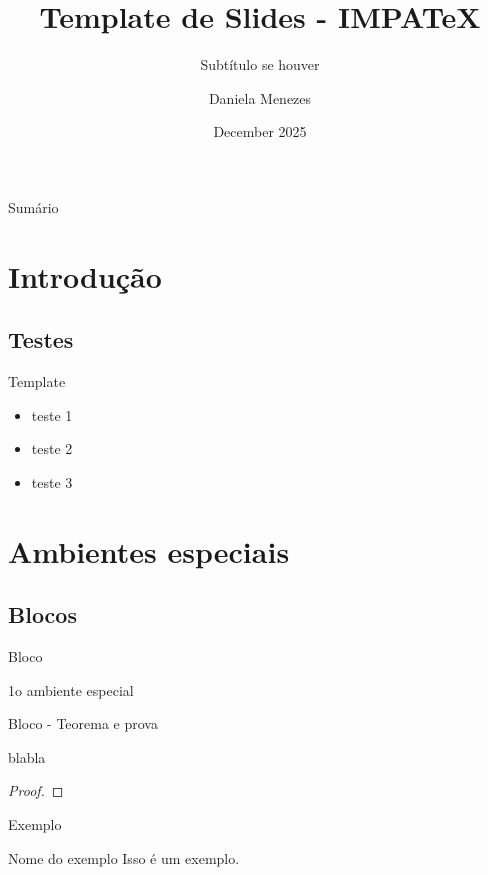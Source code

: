 \documentclass[aspectratio = 169]{beamer}
\title{Template de Slides - IMPATeX}
\subtitle{Subtítulo se houver}
\author{Daniela Menezes}
\date{December 2025}
\begin{document}
\begin{frame}[plain]
\titlepage    
\end{frame}

\begin{frame}{Sumário}
    \tableofcontents    
\end{frame}

\section{Introdução}
\subsection{Testes}
\begin{frame}{Template}
\begin{itemize}
    \item<1-> teste 1
    \item<2-> teste 2
    \item<3-> teste 3 
    
\end{itemize}
    
\end{frame}

\section{Ambientes especiais}
\subsection{Blocos}
    \begin{frame}{Bloco}
        \begin{block}{1o ambiente especial}
            \lipsum[2]
        \end{block}
    \end{frame}
    
    \begin{frame}{Bloco - Teorema e prova}
        \begin{teorema}
            blabla
        \end{teorema}

        \begin{proof}
            \lipsum[2]
            
        \end{proof}
    \end{frame}

    \begin{frame}{Exemplo}
        \begin{exampleblock}{Nome do exemplo}
            Isso é um exemplo.
        \end{exampleblock}      
    \end{frame}
\end{document}
